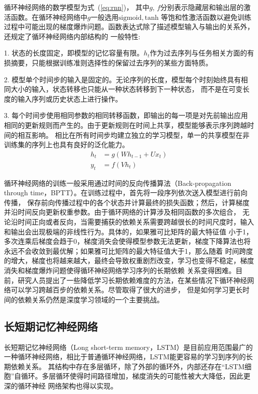 循环神经网络的数学模型为式~(\ref{eq:rnn})， 其中\(g\), \(f\)分别表示隐藏层和输出层的激活函数。在循环神经网络中\(g\)一般选用\(\mathrm{sigmoid}, \mathrm{tanh}\)
等饱和性激活函数以避免训练过程中可能出现的梯度爆炸问题。函数表达式除了描述模型输入与输出的关系外，还规定了循环神经网络内部结构的
一般特性:

 1. 状态的长度固定，即模型的记忆容量有限。\(h_t\)作为过去序列与任务相关方面的有损摘要，只能根据训练准则选择性的保留过去序列的某些方面特质。

 2. 模型单个时间步的输入是固定的。无论序列的长度，模型每个时刻始终具有相同大小的输入，状态转移也只能从一种状态转移到下一种状态，
而不是在可变长度的输入序列或历史状态上进行操作。

 3. 每个时间步使用相同参数的相同转移函数，即输出的每一项是对先前输出应用相同的更新规则而产生的。由于更新规则在时间上共享，模型能够表示序列跨越时间的相互影响。
相比在所有时间步均建立独立的学习模型，单一的共享模型在非训练集的序列上也具有良好的泛化能力。
\begin{equation}\label{eq:rnn}
	\begin{split}
		h_{t} &= g(W h_{t-1} + U x_{t})	\\
		y_{t} &= f(V h_{t})						
	\end{split}
\end{equation}

循环神经网络的训练一般采用通过时间的反向传播算法（Back-propagation through time，BPTT）。在训练过程中，首先将一段序列依次送入模型进行前向传播，
保存前向传播过程中的各个状态并计算最终的损失函数；然后，计算梯度并沿时间反向更新权重参数。由于循环网络的计算涉及相同函数的多次组合，
无论沿时间正向或者反向，当需要捕获的依赖关系需要跨越很长的时间尺度时，输入和输出会出现极端的非线性行为。具体的，如果雅可比矩阵的最大特征值
小于1，多次连乘后梯度会趋于0，梯度消失会使得模型参数无法更新，梯度下降算法也将永远不会收敛到最优解；如果雅可比矩阵的最大特征值大于1，那么随着
时间跨度的增大，梯度也将越来越大，最终会导致权重剧烈改变，学习也变得不稳定，梯度消失和梯度爆炸问题使得循环神经网络学习序列的长期依赖
关系变得困难。目前，研究人员提出了一些降低学习长期依赖难度的方法，在某些情况下循环神经网络可以学习跨越百步的依赖关系。尽管取得了很大的进步，
但是如何学习更长时间的依赖关系仍然是深度学习领域的一个主要挑战。


\subsection{长短期记忆神经网络}
长短期记忆神经网络（Long short-term memory，LSTM）是目前应用范围最广的一种循环神经网络，相比于普通循环神经网络，LSTM能更容易的学习到序列的长期依赖关系。
其结构中存在多层循环，除了外部的循环外，内部还存在“LSTM细胞”自循环。多层循环使得时间路径增加，梯度消失的可能性被大大降低，因此更深的循环神经
网络架构也得以实现。

